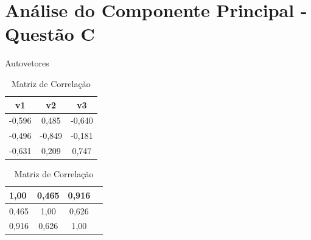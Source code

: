 \documentclass[11pt,a4paper,openany,oneside]{abntex2}
\begin{document}
	
%




\chapter{Análise do Componente Principal - Questão C}
\label{qc}

\begin{table}[H]
		\begin{minipage}[b]{0.45\linewidth}
			\centering
			\caption{Autovetores}
			\begin{tabular}{|c|c|c|}
				\toprule
				\textbf{v1} &  \textbf{v2} &  \textbf{v3}  \\ \hline
				-0,596 & 0,485 & -0,640 \\ \hline
				-0,496 & -0,849 & -0,181 \\ \hline
				-0,631 & 0,209  & 0,747 \\ 
				\bottomrule
			\end{tabular}
			\label{tab:autovetores}	
		\end{minipage}
		\hspace{0.5cm}
		\begin{minipage}[b]{0.45\linewidth}
			\centering
			\caption{Matriz de Correlação} 
			\begin{tabular}{|l|c|c|c|}
				\toprule
				1,00 & 0,465 & 0,916\\ \hline
				0,465 & 1,00 & 0,626\\ \hline
				0,916 & 0,626	& 1,00\\ 
				
				\bottomrule
			\end{tabular}%
			\label{tab:matrizcorrelacao}%
			
		\end{minipage}
\end{table}%
\end{document}

